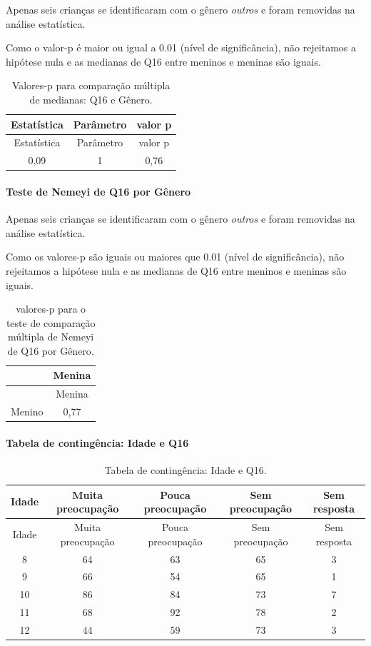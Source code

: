 \documentclass[]{article}
\let\oldparagraph\paragraph
\renewcommand{\paragraph}[1]{\oldparagraph{#1}\mbox{}}
\begin{document}
Apenas seis crianças se identificaram com o gênero \emph{outros} e foram removidas na análise estatística.

Como o valor-p é maior ou igual a 0.01 (nível de significância), não rejeitamos a hipótese nula e as medianas de Q16 entre meninos e meninas são iguais.

\begin{longtable}[]{@{}ccc@{}}
\caption{\label{tab:unnamed-chunk-147}Valores-p para comparação múltipla de medianas: Q16 e Gênero.}\tabularnewline
\toprule
Estatística & Parâmetro & valor p\tabularnewline
\midrule
\endfirsthead
\toprule
Estatística & Parâmetro & valor p\tabularnewline
\midrule
\endhead
0,09 & 1 & 0,76\tabularnewline
\bottomrule
\end{longtable}

\hypertarget{teste-de-nemeyi-de-q16-por-guxeanero}{%
\paragraph{Teste de Nemeyi de Q16 por Gênero}\label{teste-de-nemeyi-de-q16-por-guxeanero}}

Apenas seis crianças se identificaram com o gênero \emph{outros} e foram removidas na análise estatística.

Como os valores-p são iguais ou maiores que 0.01 (nível de significância), não rejeitamos a hipótese nula e as medianas de Q16 entre meninos e meninas são iguais.

\begin{longtable}[]{@{}lc@{}}
\caption{\label{tab:unnamed-chunk-149}valores-p para o teste de comparação múltipla de Nemeyi de Q16 por Gênero.}\tabularnewline
\toprule
& Menina\tabularnewline
\midrule
\endfirsthead
\toprule
& Menina\tabularnewline
\midrule
\endhead
Menino & 0,77\tabularnewline
\bottomrule
\end{longtable}

\cleardoublepage

\hypertarget{tabela-de-continguxeancia-idade-e-q16}{%
\paragraph{Tabela de contingência: Idade e Q16}\label{tabela-de-continguxeancia-idade-e-q16}}

\begin{longtable}[]{@{}ccccc@{}}
\caption{\label{tab:unnamed-chunk-150}Tabela de contingência: Idade e Q16.}\tabularnewline
\toprule
Idade & Muita preocupação & Pouca preocupação & Sem preocupação & Sem resposta\tabularnewline
\midrule
\endfirsthead
\toprule
Idade & Muita preocupação & Pouca preocupação & Sem preocupação & Sem resposta\tabularnewline
\midrule
\endhead
8 & 64 & 63 & 65 & 3\tabularnewline
9 & 66 & 54 & 65 & 1\tabularnewline
10 & 86 & 84 & 73 & 7\tabularnewline
11 & 68 & 92 & 78 & 2\tabularnewline
12 & 44 & 59 & 73 & 3\tabularnewline
\bottomrule
\end{longtable}
\end{document}
